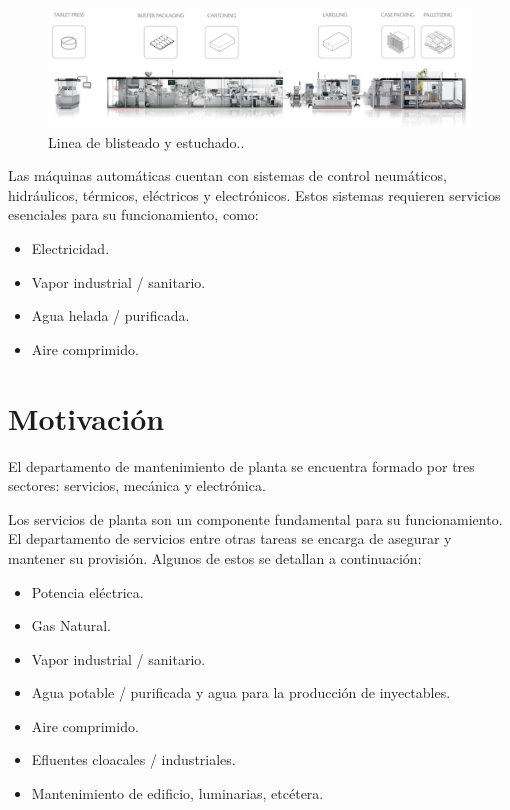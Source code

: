\begin{figure}[htbp]
	\centering
	\includegraphics[width=1\textwidth]{./Figures/IMA.png}
	\caption{Linea de blisteado y estuchado.\protect\footnotemark.}
	\label{fig:LINEA}
\end{figure}


Las máquinas automáticas cuentan con sistemas de control neumáticos, hidráulicos, térmicos, eléctricos y electrónicos. Estos sistemas requieren servicios esenciales para su funcionamiento, como:
 
\begin{itemize}
	\item Electricidad.
	\item Vapor industrial / sanitario.
	\item Agua helada / purificada.
	\item Aire comprimido.
\end{itemize}


\section{Motivación}

El departamento de mantenimiento de planta se encuentra formado por tres sectores: servicios, mecánica y electrónica.


Los servicios de planta son un componente fundamental para su funcionamiento. El departamento de servicios entre otras tareas se encarga de asegurar y mantener su provisión. Algunos de estos se detallan a continuación:

\begin{itemize}
	\item Potencia eléctrica.
	\item Gas Natural.
	\item Vapor industrial / sanitario.
	\item Agua potable / purificada y agua para la producción de inyectables.
	\item Aire comprimido.
	\item Efluentes cloacales / industriales.
	\item Mantenimiento de edificio, luminarias, etcétera.
\end{itemize}

